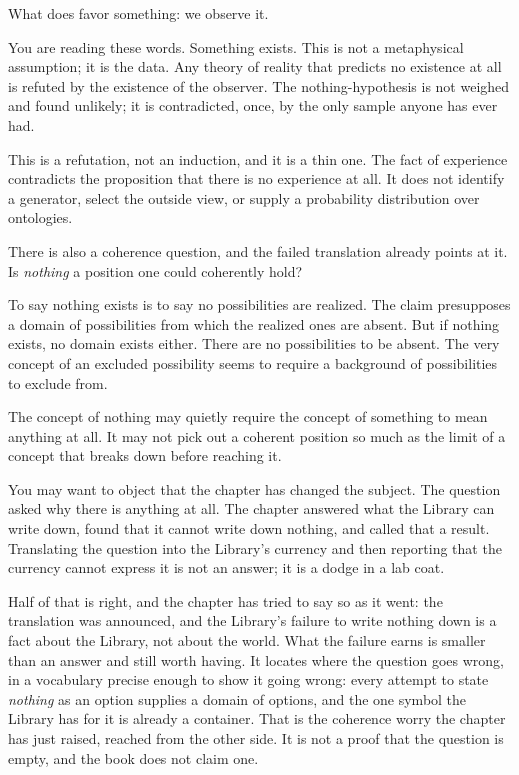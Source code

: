 What does favor something: we observe it.

You are reading these words. Something exists. This is not a metaphysical assumption; it is the data. Any theory of reality that predicts no existence at all is refuted by the existence of the observer. The nothing-hypothesis is not weighed and found unlikely; it is contradicted, once, by the only sample anyone has ever had.

This is a refutation, not an induction, and it is a thin one. The fact of experience contradicts the proposition that there is no experience at all. It does not identify a generator, select the outside view, or supply a probability distribution over ontologies.

There is also a coherence question, and the failed translation already points at it. Is \emph{nothing} a position one could coherently hold?

To say nothing exists is to say no possibilities are realized. The claim presupposes a domain of possibilities from which the realized ones are absent. But if nothing exists, no domain exists either. There are no possibilities to be absent. The very concept of an excluded possibility seems to require a background of possibilities to exclude from.

The concept of nothing may quietly require the concept of something to mean anything at all. It may not pick out a coherent position so much as the limit of a concept that breaks down before reaching it.

You may want to object that the chapter has changed the subject. The question asked why there is anything at all. The chapter answered what the Library can write down, found that it cannot write down nothing, and called that a result. Translating the question into the Library's currency and then reporting that the currency cannot express it is not an answer; it is a dodge in a lab coat.

Half of that is right, and the chapter has tried to say so as it went: the translation was announced, and the Library's failure to write nothing down is a fact about the Library, not about the world. What the failure earns is smaller than an answer and still worth having. It locates where the question goes wrong, in a vocabulary precise enough to show it going wrong: every attempt to state \emph{nothing} as an option supplies a domain of options, and the one symbol the Library has for it is already a container. That is the coherence worry the chapter has just raised, reached from the other side. It is not a proof that the question is empty, and the book does not claim one.

